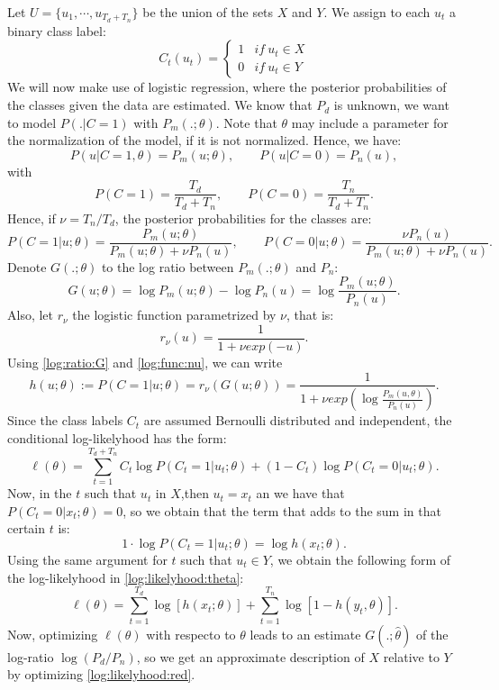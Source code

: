 Let $U = \{u_1,\cdots,u_{T_d + T_n}\}$ be the union of the sets $X$ and $Y$. We assign to each $u_t$ a binary class label:
\[
C_t(u_t) = \begin{cases}
1 & if \ u_t \in X\\
0 & if \ u_t \in Y
\end{cases}
\]
We will now make use of logistic regression, where the posterior probabilities of the classes given the data are estimated. We know that $P_d$ is unknown, we want to model $P(.|C=1)$ with $P_m(.;\theta)$. Note that $\theta$ may include a parameter for the normalization of the model, if it is not normalized. Hence, we have:
\[
P(u|C = 1,\theta) = P_m(u;\theta), \quad \quad P(u|C = 0) = P_n(u),
\]
with
\[
P(C = 1) = \frac{T_d}{T_d + T_n}, \quad \quad P(C = 0) = \frac{T_n}{T_d + T_n}.
\]
Hence, if $\nu = T_n/T_d$, the posterior probabilities for the classes are:
\[
P(C=1|u;\theta) = \frac{P_m(u;\theta)}{P_m(u;\theta) + \nu P_n(u)}, \quad \quad P(C = 0|u; \theta) = \frac{\nu P_n(u)}{P_m(u;\theta) + \nu P_n(u)}.
\]
Denote $G(.;\theta)$ to the log ratio between $P_m(.;\theta)$ and $P_n$:
\begin{equation}\label{log:ratio:G}
G(u;\theta) = \log P_m(u;\theta) - \log P_n(u) = \log \frac{P_m(u;\theta)}{P_n(u)}.
\end{equation}
Also, let $r_\nu$ the logistic function parametrized by $\nu$, that is:
\begin{equation}\label{log:func:nu}
r_\nu(u) = \frac{1}{1 + \nu exp(-u)}.
\end{equation}
Using \eqref{log:ratio:G} and \eqref{log:func:nu}, we can write
\[
h(u;\theta) := P(C = 1|u ; \theta) =    r_\nu(G(u;\theta)) = \frac{1}{1+ \nu exp(\log \frac{P_m(u,\theta)}{P_n(u)})}. 
\]
Since the class labels $C_t$ are assumed Bernoulli distributed and independent, the conditional log-likelyhood has the form:
\begin{equation}\label{log:likelihood:theta}
\ell(\theta)  = \sum_{t = 1}^{T_d + T_n} C_t \log P(C_t = 1|u_t; \theta) + (1-C_t) \log P(C_t = 0|u_t;\theta).
\end{equation}
Now, in the $t$ such that $u_t$ in $X$,then  $u_t = x_t$ an we have that $P(C_t = 0|x_t;\theta) = 0$, so we obtain that the term that adds to the sum in that certain $t$ is:
\[
1\cdot \log P(C_t = 1|u_t;\theta) = \log h(x_t;\theta).
\]
Using the same argument for $t$ such that $u_t \in Y$, we obtain the following form of the log-likelyhood in \eqref{log:likelyhood:theta}:
\begin{equation}\label{log:likelihood:red}
\ell(\theta) = \sum_{t = 1}^{T_d} \log [h(x_t;\theta)] + \sum_{t = 1}^{T_n} \log[1- h(y_t,\theta)].
\end{equation}
Now, optimizing $\ell(\theta)$ with respecto to $\theta$ leads to an estimate $G(.;\hat{\theta})$ of the log-ratio $\log (P_d/P_n)$, so we get an approximate description of $X$ relative to $Y$ by optimizing \eqref{log:likelyhood:red}.

